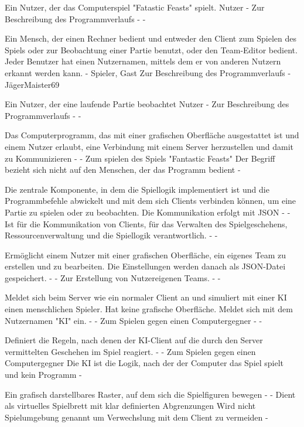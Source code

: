 	{Ein Nutzer, der das Computerspiel "Fatastic Feasts" spielt.}
	{Nutzer}
	{-}
	{Zur Beschreibung des Programmverlaufs}
	{-}
	{-}
	
	{Ein Mensch, der einen Rechner bedient und entweder den Client zum Spielen des Spiels oder zur Beobachtung einer Partie benutzt, oder den Team-Editor bedient. Jeder Benutzer hat einen Nutzernamen, mittels dem er von anderen Nutzern erkannt werden kann.}
	{-}
	{Spieler, Gast}
	{Zur Beschreibung des Programmverlaufs}
	{-}
	{JägerMaister69}
	
	{Ein Nutzer, der eine laufende Partie beobachtet}
	{Nutzer}
	{-}
	{Zur Beschreibung des Programmverlaufs}
	{-}
	{-}
	
	{Das Computerprogramm, das mit einer grafischen Oberfläche ausgestattet ist und einem Nutzer erlaubt, eine Verbindung mit einem Server herzustellen und damit zu Kommunizieren}
	{-}
	{-}
	{Zum spielen des Spiels "Fantastic Feasts"}
	{Der Begriff bezieht sich nicht auf den Menschen, der das Programm bedient}
	{-}
	
	{Die zentrale Komponente, in dem die Spiellogik implementiert ist und die Programmbefehle abwickelt und mit dem sich Clients verbinden können, um eine Partie zu spielen oder zu beobachten. Die Kommunikation erfolgt mit JSON}
	{-}
	{-}
	{Ist für die Kommunikation von Clients, für das Verwalten des Spielgeschehens, Ressourcenverwaltung und die Spiellogik verantwortlich.}
	{-}
	{-}
	
	{Ermöglicht einem Nutzer mit einer grafischen Oberfläche, ein eigenes Team zu erstellen und zu bearbeiten. Die Einstellungen werden danach als JSON-Datei gespeichert.}
	{-}
	{-}
	{Zur Erstellung von Nutzereigenen Teams.}
	{-}
	{-}
	
	{Meldet sich beim Server wie ein normaler Client an und simuliert mit einer KI einen menschlichen Spieler. Hat keine grafische Oberfläche. Meldet sich mit dem Nutzernamen "KI" ein.}
	{-}
	{-}
	{Zum Spielen gegen einen Computergegner}
	{-}
	{-}
	
	{Definiert die Regeln, nach denen der KI-Client auf die durch den Server vermittelten Geschehen im Spiel reagiert.}
	{-}
	{-}
	{Zum Spielen gegen einen Computergegner}
	{Die KI ist die Logik, nach der der Computer das Spiel spielt und kein Programm}
	{-}
	
	{Ein grafisch darstellbares Raster, auf dem sich die Spielfiguren bewegen}
	{-}
	{-}
	{Dient als virtuelles Spielbrett mit klar definierten Abgrenzungen}
	{Wird nicht Spielumgebung genannt um Verwechslung mit dem Client zu vermeiden}
	{-}
	
